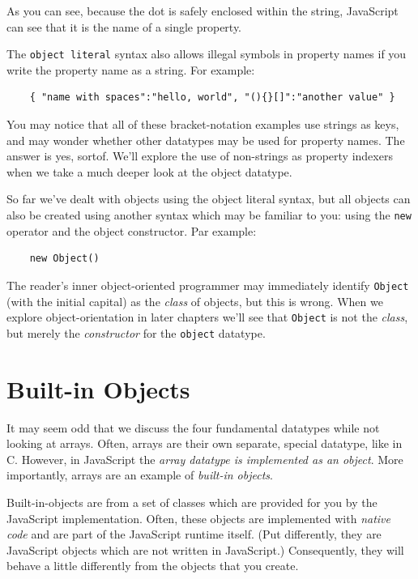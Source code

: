 \documentclass[11pt,letter]{book}
\begin{document}
    As you can see, because the dot is safely enclosed within the string, JavaScript can see that it 
    is the name of a single property.
    
    The \texttt{object literal} syntax also allows illegal symbols in property names if you write
    the property name as a string. For example:
    
    \begin{verbatim}
    { "name with spaces":"hello, world", "(){}[]":"another value" }
    \end{verbatim}
    
    You may notice that all of these bracket-notation examples use strings as keys, and may wonder
    whether other datatypes may be used for property names. The answer is yes, sortof. We'll explore 
    the use of non-strings as property indexers when we take a much deeper look at the object 
    datatype.
    
    So far we've dealt with objects using the object literal syntax, but all objects can also be 
    created using another syntax which may be familiar to you: using the \texttt{new} operator and 
    the object constructor. Par example:
    
    \begin{verbatim}
    new Object()
    \end{verbatim}
    
    The reader's inner object-oriented programmer may immediately identify \texttt{Object} (with the 
    initial capital) as the \emph{class} of objects, but this is wrong. When we explore 
    object-orientation in later chapters we'll see that \texttt{Object} is not the \emph{class}, but 
    merely the \emph{constructor} for the \texttt{object} datatype.
    
    \section{Built-in Objects}
    It may seem odd that we discuss the four fundamental datatypes while not looking at arrays.
    Often, arrays are their own separate, special datatype, like in C. However, in JavaScript the 
    \emph{array datatype is implemented as an object}. More importantly, arrays are an example of 
    \emph{built-in objects}.
    
    Built-in-objects are from a set of classes which are provided for you by the JavaScript 
    implementation. Often, these objects are implemented with \emph{native code} and are part of 
    the JavaScript runtime itself. (Put differently, they are JavaScript objects which are not 
    written in JavaScript.) Consequently, they will behave a little differently from the objects 
    that you create.
    
\end{document}
